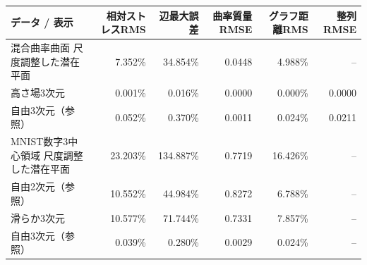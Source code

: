 \begin{tabular}{lrrrrr}
\toprule
データ / 表示 & 相対ストレスRMS & 辺最大誤差 & 曲率質量RMSE & グラフ距離RMS & 整列RMSE \\
\midrule
混合曲率曲面 尺度調整した潜在平面 & 7.352\% & 34.854\% & 0.0448 & 4.988\% & -- \\
 高さ場3次元 & 0.001\% & 0.016\% & 0.0000 & 0.000\% & 0.0000 \\
 自由3次元（参照） & 0.052\% & 0.370\% & 0.0011 & 0.024\% & 0.0211 \\
\addlinespace
MNIST数字3中心領域 尺度調整した潜在平面 & 23.203\% & 134.887\% & 0.7719 & 16.426\% & -- \\
 自由2次元（参照） & 10.552\% & 44.984\% & 0.8272 & 6.788\% & -- \\
 滑らか3次元 & 10.577\% & 71.744\% & 0.7331 & 7.857\% & -- \\
 自由3次元（参照） & 0.039\% & 0.280\% & 0.0029 & 0.024\% & -- \\
\bottomrule
\end{tabular}
